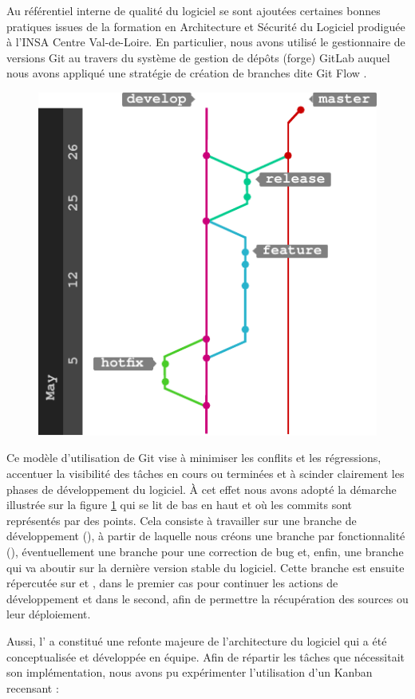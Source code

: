   Au référentiel interne de qualité du logiciel se sont ajoutées certaines bonnes pratiques issues de la formation en Architecture et Sécurité du Logiciel prodiguée à l'INSA Centre Val-de-Loire.
  En particulier, nous avons utilisé le gestionnaire de versions Git au travers du système de gestion de dépôts (forge) GitLab auquel nous avons appliqué une stratégie de création de branches dite \og Git Flow \fg{}.
    \begin{figure}[h]
    \centering
      \includegraphics[width=.6\linewidth]{figures/gitflow}  
    \label{fig:gitflow}
  \end{figure}
  Ce modèle d'utilisation de Git vise à minimiser les conflits et les régressions, accentuer la visibilité des tâches en cours ou terminées et à scinder clairement les phases de développement du logiciel. 
  \`{A} cet effet nous avons adopté la démarche illustrée sur la figure \ref{fig:gitflow} qui se lit de bas en haut et où les commits sont représentés par des points.
  Cela consiste à travailler sur une branche de développement (), à partir de laquelle nous créons une branche par fonctionnalité (), éventuellement une branche  pour une correction de bug
  et, enfin, une branche  qui va aboutir sur la dernière version stable du logiciel.
  Cette branche est ensuite répercutée sur  et , dans le premier cas  pour continuer les actions de développement et dans le second, afin de permettre la récupération des sources ou leur déploiement. 
  
  Aussi, l' a constitué une refonte majeure de l'architecture du logiciel qui a été conceptualisée et développée en équipe. 
  Afin de répartir les tâches que nécessitait son implémentation, nous avons pu expérimenter l'utilisation d'un \gls{Kanban} recensant : 
  
